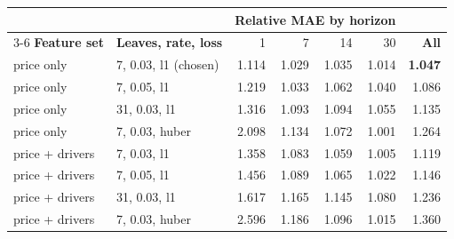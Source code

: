 \begin{tabular}{llrrrrr}
\toprule
 & & \multicolumn{4}{c}{\textbf{Relative MAE by horizon}} & \\
\cmidrule(lr){3-6}
\textbf{Feature set} & \textbf{Leaves, rate, loss} & 1 & 7 & 14 & 30 & \textbf{All} \\
\midrule
price only & 7, 0.03, l1 (chosen) & 1.114 & 1.029 & 1.035 & 1.014 & \textbf{1.047} \\
price only & 7, 0.05, l1 & 1.219 & 1.033 & 1.062 & 1.040 & 1.086 \\
price only & 31, 0.03, l1 & 1.316 & 1.093 & 1.094 & 1.055 & 1.135 \\
price only & 7, 0.03, huber & 2.098 & 1.134 & 1.072 & 1.001 & 1.264 \\
price + drivers & 7, 0.03, l1 & 1.358 & 1.083 & 1.059 & 1.005 & 1.119 \\
price + drivers & 7, 0.05, l1 & 1.456 & 1.089 & 1.065 & 1.022 & 1.146 \\
price + drivers & 31, 0.03, l1 & 1.617 & 1.165 & 1.145 & 1.080 & 1.236 \\
price + drivers & 7, 0.03, huber & 2.596 & 1.186 & 1.096 & 1.015 & 1.360 \\
\bottomrule
\end{tabular}
